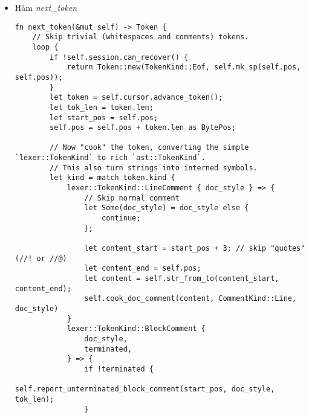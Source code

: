{\begin{itemize}
\begin{lstlisting}
    /* Literals */
    Literal(Lit),
    
    Ident(Symbol, IdentIsRaw),
    
    /// A doc comment token.
    /// `Symbol` is the data of doc's comment excluding its "quotes" (`///`, `/**`, etc)
    DocComment(CommentKind, Option<DocStyle>, Symbol),
    
    /// End Of File.
    Eof,
}
\end{lstlisting}
  \item \label{ap1:flex_token_next_token}Hàm \textit{next\_token}
\begin{lstlisting}
fn next_token(&mut self) -> Token {
    // Skip trivial (whitespaces and comments) tokens.
    loop {
        if !self.session.can_recover() {
            return Token::new(TokenKind::Eof, self.mk_sp(self.pos, self.pos));
        }
        let token = self.cursor.advance_token();
        let tok_len = token.len;
        let start_pos = self.pos;
        self.pos = self.pos + token.len as BytePos;

        // Now "cook" the token, converting the simple `lexer::TokenKind` to rich `ast::TokenKind`.
        // This also turn strings into interned symbols.
        let kind = match token.kind {
            lexer::TokenKind::LineComment { doc_style } => {
                // Skip normal comment
                let Some(doc_style) = doc_style else {
                    continue;
                };

                let content_start = start_pos + 3; // skip "quotes" (//! or //@)
                let content_end = self.pos;
                let content = self.str_from_to(content_start, content_end);
                self.cook_doc_comment(content, CommentKind::Line, doc_style)
            }
            lexer::TokenKind::BlockComment {
                doc_style,
                terminated,
            } => {
                if !terminated {
                    self.report_unterminated_block_comment(start_pos, doc_style, tok_len);
                }


\end{lstlisting}
\end{itemize}}

